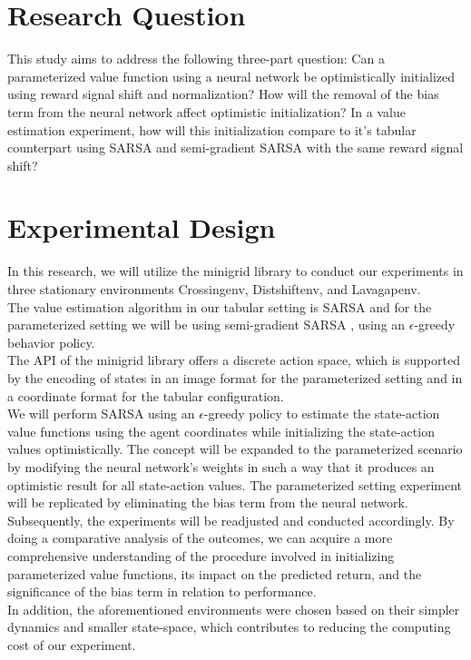 \documentclass{article}
\theoremstyle{plain}
\theoremstyle{definition}
\theoremstyle{remark}
\begin{document}
\section{Research Question}
This study aims to address the following three-part question:
Can a parameterized value function using a neural network be optimistically initialized using reward signal shift and normalization? How will the removal of the bias term from the neural network affect optimistic initialization? In a value estimation experiment, how will this initialization compare to it's tabular counterpart using SARSA and semi-gradient SARSA with the same reward signal shift?



\section{Experimental Design}
In this research, we will utilize the minigrid library \citep{Ando2005} to conduct our experiments in three stationary environments Crossingenv, Distshiftenv, and Lavagapenv.\\
The value estimation algorithm in our tabular setting is SARSA and for the parameterized setting we will be using
semi-gradient SARSA \citep{Ando2008}, using an $\epsilon$-greedy behavior \citep{Ando2006} policy.\\
The API of the minigrid library offers a discrete action space, which is supported by the encoding of states in an image format for the parameterized setting and in a coordinate format for the tabular configuration.\\
We will perform SARSA using an $\epsilon$-greedy policy to estimate the state-action value functions using the agent coordinates while initializing the state-action values optimistically. The concept will be expanded to the parameterized scenario by modifying the neural network's weights in such a way that it produces an optimistic result for all state-action values. The parameterized setting experiment will be replicated by eliminating the bias term from the neural network. Subsequently, the experiments will be readjusted and conducted accordingly. By doing a comparative analysis of the outcomes, we can acquire a more comprehensive understanding of the procedure involved in initializing parameterized value functions, its impact on the predicted return, and the significance of the bias term in relation to performance.\\
In addition, the aforementioned environments were chosen based on their simpler dynamics and smaller state-space, which contributes to reducing the computing cost of our experiment.
\end{document}
